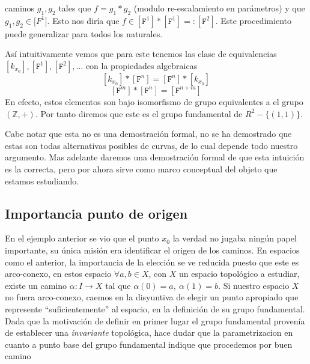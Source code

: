 {\begin{ejemplo}
\begin{itemize}
  caminos \(g_1, g_2\) tales que \(f = g_1 * g_2\) (modulo re-escalamiento
  en parámetros) y que \(g_1, g_2 \in \mathtt [F ^1]\). Esto nos diría que
  \( f \in [\mathtt F ^1] * [\mathtt F ^1] =: [\mathtt F ^2]\). Este
  procedimiento puede generalizar para todos los naturales.
\end{itemize}
Así intuitivamente vemos que para este tenemos las clase de
equivalencias \([k_{x_0}], [\mathtt F ^1], [\mathtt F ^2], \dots \) con
la propiedades algebraicas
\[ [k_{x_0}] * [\mathtt F ^n] = [\mathtt F ^n] * [k_{x_0}]\]
\[ [\mathtt F ^m]  * [\mathtt F ^n] = [\mathtt F ^{n + m}]\]
En efecto, estos elementos son bajo isomorfismo de grupo equivalentes a
el grupo \((\mathbb{Z}, +)\). Por tanto diremos que este es el grupo
fundamental de \(R^2 - \{(1,1)\}\).
\end{ejemplo}

Cabe notar que esta no es una demostración formal, no se ha demostrado
que estas son todas alternativas posibles de curvas, de lo cual depende
todo nuestro argumento. Mas adelante daremos una demostración formal de
que esta intuición es la correcta, pero por ahora sirve como marco
conceptual del objeto que estamos estudiando.

\subsection{Importancia punto de origen}
En el ejemplo anterior se vio que el punto \(x_0\) la verdad no
jugaba ningún papel importante, su única misión era identificar el
origen de los caminos. En espacios como el anterior, la importancia de
la elección se ve reducida puesto que este es arco-conexo, en estos
espacio \(\forall a,b \in X\), con \(X\) un espacio topológico a
estudiar, existe un camino \(\alpha : I \to X\) tal que \(\alpha (0) =
a,\ \alpha (1) = b\). Si nuestro espacio \(X\) no fuera arco-conexo,
caemos en la disyuntiva de elegir un punto apropiado que represente
``suficientemente'' al espacio, en la definición de su grupo
fundamental. Dada que la motivación de definir en primer lugar el grupo
fundamental provenía de establecer una \emph{invariante} topológica,
hace dudar que la parametrizacion en cuanto a punto base del grupo
fundamental indique que procedemos por buen camino

}
